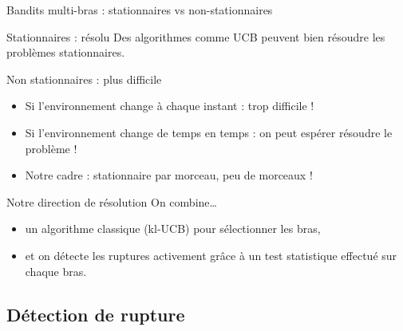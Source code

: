 \documentclass[11pt,french,ignorenonframetext,]{beamer}
\begin{document}
\begin{frame}{Bandits multi-bras : stationnaires vs non-stationnaires}

  \begin{block}{Stationnaires : résolu}
    Des algorithmes comme UCB peuvent bien résoudre les problèmes stationnaires.
  \end{block}

  \pause

  \begin{alertblock}{Non stationnaires : plus difficile}
    \begin{itemize}
      \item Si l'environnement change à chaque instant : trop difficile !
      \item Si l'environnement change de temps en temps : on peut espérer résoudre le problème !
      \item Notre cadre : stationnaire par morceau, peu de morceaux !
    \end{itemize}
  \end{alertblock}

  \pause

  \begin{block}{Notre direction de résolution}
    On combine\ldots{}
    \begin{itemize}
      \item un \alert{algorithme classique} (kl-UCB) pour sélectionner les bras,
      \item et \alert{on détecte les ruptures activement grâce à un test statistique} effectué sur chaque bras.
    \end{itemize}
  \end{block}

\end{frame}


\subsection{\hfill{}Détection de rupture\hfill{}}
\end{document}
